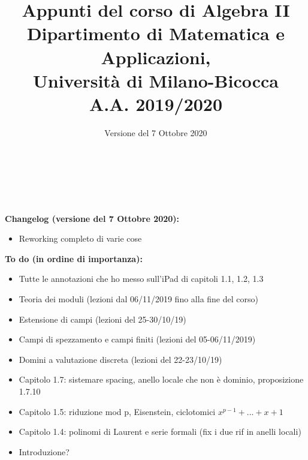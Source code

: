 \documentclass{article}
\begin{document}
\AddToShipoutPicture*{\BackgroundPic}

\title{\Huge{\textbf{Appunti del corso di Algebra II}} \\ \vspace{3mm}
	   \LARGE{\textbf{Dipartimento di Matematica e Applicazioni,}} \\ 
	   \LARGE{\textbf{Università di Milano-Bicocca}} \\ \vspace{3mm}
	   \Large{\textbf{A.A. 2019/2020}} %
	   }
\author{Versione del 7 Ottobre 2020}
\date{}

\maketitle
\thispagestyle{empty}
\clearpage

\tableofcontents

\

\

\noindent \textbf{Changelog (versione del 7 Ottobre 2020):}
\begin{itemize}
\item Reworking completo di varie cose
\end{itemize}

\noindent \textbf{To do (in ordine di importanza):}
\begin{itemize}
	\item Tutte le annotazioni che ho messo sull'iPad di capitoli 1.1, 1.2, 1.3
	\item Teoria dei moduli (lezioni dal 06/11/2019 fino alla fine del corso)
	\item Estensione di campi (lezioni del 25-30/10/19)
	\item Campi di spezzamento e campi finiti (lezioni del 05-06/11/2019)
	\item Domini a valutazione discreta (lezioni del 22-23/10/19)
	\item Capitolo 1.7: sistemare spacing, anello locale che non è dominio, proposizione 1.7.10
	\item Capitolo 1.5: riduzione mod p, Eisenstein, ciclotomici $x^{p-1}+...+x+1$
	\item Capitolo 1.4: polinomi di Laurent e serie formali (fix i due rif in anelli locali)
	\item Introduzione?
\end{itemize}
\clearpage
\end{document}
